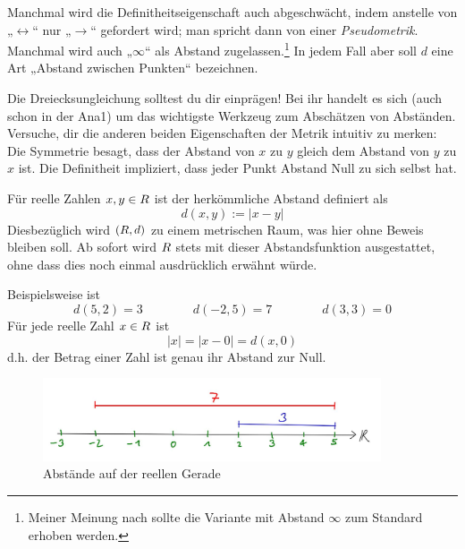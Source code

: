 \begin{bem}
    Manchmal wird die Definitheitseigenschaft auch abgeschwächt, indem anstelle von „$\leftrightarrow$“ nur „$\rightarrow$“ gefordert wird; man spricht dann von einer \emph{Pseudometrik}. Manchmal wird auch „$\infty$“ als Abstand zugelassen.\footnote{Meiner Meinung nach sollte die Variante mit Abstand $\infty$ zum Standard erhoben werden.} In jedem Fall aber soll $d$ eine Art „Abstand zwischen Punkten“ bezeichnen.
    
    Die Dreiecksungleichung solltest du dir einprägen! Bei ihr handelt es sich (auch schon in der Ana1) um das wichtigste Werkzeug zum Abschätzen von Abständen. Versuche, dir die anderen beiden Eigenschaften der Metrik intuitiv zu merken: Die Symmetrie besagt, dass der Abstand von $x$ zu $y$ gleich dem Abstand von $y$ zu $x$ ist. Die Definitheit impliziert, dass jeder Punkt Abstand Null zu sich selbst hat.
\end{bem}


\begin{defin}[Abstand in $\R$]
    Für reelle Zahlen $x,y\in \relax R$ ist der herkömmliche Abstand definiert als
        \[ d(x,y) := \vert x -y\vert \]
    Diesbezüglich wird $(\relax R,d)$ zu einem metrischen Raum, was hier ohne Beweis bleiben soll. Ab sofort wird $\R$ stets mit dieser Abstandsfunktion ausgestattet, ohne dass dies noch einmal ausdrücklich erwähnt würde.
\end{defin}


\begin{bsp}
    Beispielsweise ist
        \[ d(5,2)= 3 \qquad\qquad d(-2,5)=7 \qquad\qquad d(3,3)=0 \]
    Für jede reelle Zahl $x\in \relax R$ ist
        \[ \vert x\vert = \vert x-0\vert = d(x,0) \]
    d.h. der Betrag einer Zahl ist genau ihr Abstand zur Null. 
    \begin{figure}[ht]
        \includegraphics[width=10cm]{./_img/Abstand.jpeg}
        \centering \caption{Abstände auf der reellen Gerade}
    \end{figure}
\end{bsp}


